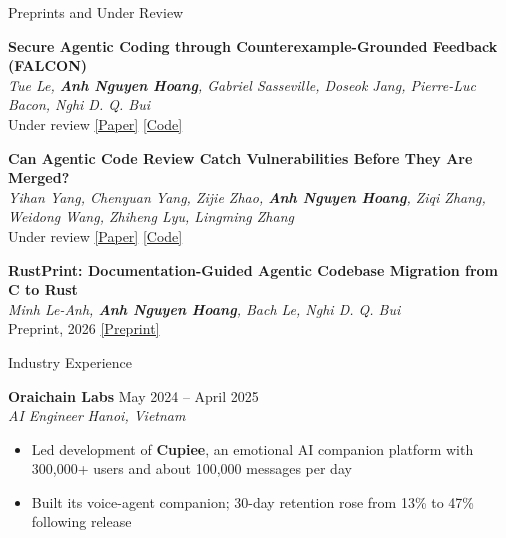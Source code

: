 \documentclass{resume}
\begin{document}
\begin{rSection}{Preprints and Under Review}

\begin{enumerate}[leftmargin=1.8em,label={[\arabic*]},itemsep=0.1em,topsep=0.1em]
    \item
    \textbf{Secure Agentic Coding through Counterexample-Grounded
    Feedback (FALCON)}\\
    \textit{Tue Le, \textbf{Anh Nguyen Hoang}, Gabriel Sasseville, Doseok Jang,
    Pierre-Luc Bacon, Nghi D. Q. Bui}\\
    Under review
    \href{https://arxiv.org/abs/2610.25916}{[Paper]}
    \href{https://github.com/FSoft-AI4Code/FALCON}{[Code]}

    \item
    \textbf{Can Agentic Code Review Catch Vulnerabilities Before They Are Merged?}\\
    \textit{Yihan Yang, Chenyuan Yang, Zijie Zhao, \textbf{Anh Nguyen Hoang},
    Ziqi Zhang, Weidong Wang, Zhiheng Lyu, Lingming Zhang}\\
    Under review
    \href{https://secprbench.github.io/paper.pdf}{[Paper]}
    \href{https://github.com/secprbench/secprbench}{[Code]}

    \item
    \textbf{RustPrint: Documentation-Guided Agentic Codebase Migration from C to Rust}\\
    \textit{Minh Le-Anh, \textbf{Anh Nguyen Hoang}, Bach Le, Nghi D. Q. Bui}\\
    Preprint, 2026
    \href{https://arxiv.org/abs/2605.14634}{[Preprint]}
\end{enumerate}

\end{rSection}

\begin{rSection}{Industry Experience}

\textbf{Oraichain Labs} \hfill May 2024 -- April 2025\\
\textit{AI Engineer} \hfill \textit{Hanoi, Vietnam}
\begin{itemize}[leftmargin=1.5em,itemsep=0em,topsep=0.1em]
    \item Led development of \textbf{Cupiee}, an emotional AI companion platform
    with 300,000+ users and about 100,000 messages per day
    \item Built its voice-agent companion; 30-day retention rose from 13\% to
    47\% following release
\end{itemize}

\end{rSection}
\end{document}
